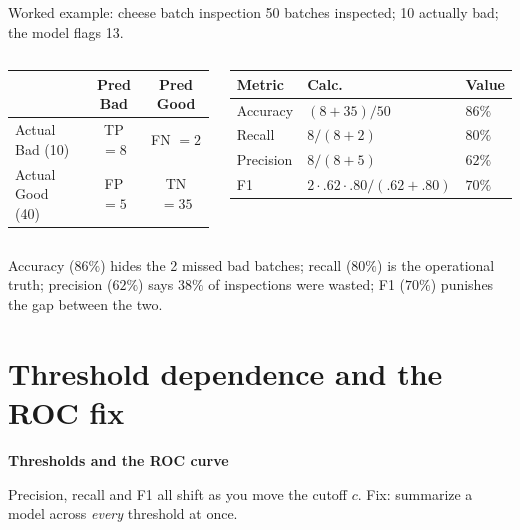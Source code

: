 \documentclass[aspectratio=169]{beamer}
\begin{document}
\begin{frame}{Worked example: cheese batch inspection}
  50 batches inspected; 10 actually bad; the model flags 13.
  \vfill
  \begin{columns}[T]
    \begin{center}\small
    \begin{tabular}{lcc}
       & \textbf{Pred Bad} & \textbf{Pred Good} \\ \hline
      Actual Bad (10) & TP $=8$ & FN $=2$ \\
      Actual Good (40) & FP $=5$ & TN $=35$ \\
    \end{tabular}
    \end{center}
    \begin{center}\small
    \begin{tabular}{lll}
      \textbf{Metric} & \textbf{Calc.} & \textbf{Value} \\ \hline
      Accuracy & $(8{+}35)/50$ & $86\%$ \\
      Recall & $8/(8{+}2)$ & $80\%$ \\
      Precision & $8/(8{+}5)$ & $62\%$ \\
      F1 & $2{\cdot}.62{\cdot}.80/(.62{+}.80)$ & $70\%$ \\
    \end{tabular}
    \end{center}
  \end{columns}
  \vfill
  \footnotesize Accuracy ($86\%$) hides the 2 missed bad batches; recall ($80\%$) is the
  operational truth; precision ($62\%$) says $38\%$ of inspections were wasted; F1 ($70\%$)
  punishes the gap between the two.
\end{frame}

\section{Threshold dependence and the ROC fix}

\begin{frame}[plain]
  \vfill
  \begin{center}
    {\Large\color{popblue}\textbf{Thresholds and the ROC curve}}\\[0.9em]
    \begin{minipage}{0.82\textwidth}\centering\small
      Precision, recall and F1 all shift as you move the cutoff $c$. Fix: summarize a
      model across \emph{every} threshold at once.
    \end{minipage}
  \end{center}
  \vfill
\end{frame}
\end{document}
